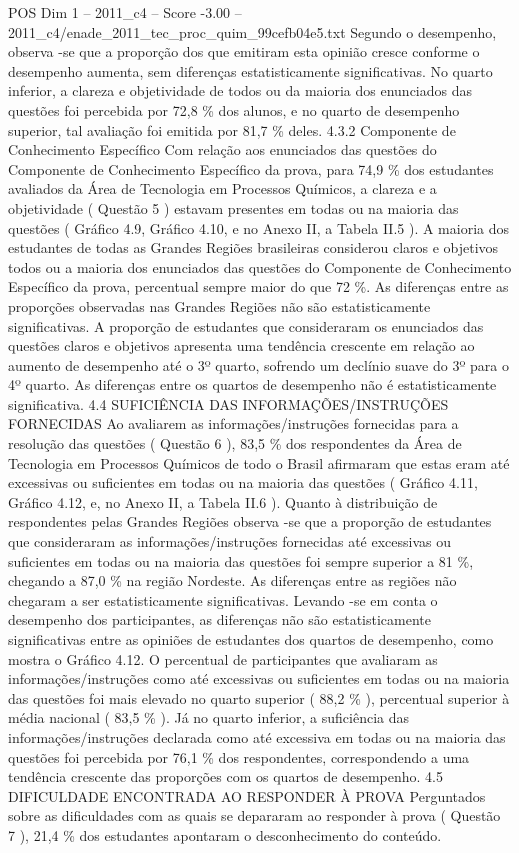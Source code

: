 \begin{textsample}{POS Dim 1 – 2011\_c4 – Score -3.00 – 2011\_c4/enade\_2011\_tec\_proc\_quim\_99cefb04e5.txt}
Segundo o desempenho, observa -se que a proporção dos que emitiram esta opinião cresce conforme o desempenho aumenta, sem diferenças estatisticamente significativas.
No quarto inferior, a clareza e objetividade de todos ou da maioria dos enunciados das questões foi percebida por 72,8 \% dos alunos, e no quarto de desempenho superior, tal avaliação foi emitida por 81,7 \% deles. 4.3.2 Componente de Conhecimento Específico Com relação aos enunciados das questões do Componente de Conhecimento Específico da prova, para 74,9 \% dos estudantes avaliados da Área de Tecnologia em Processos Químicos, a clareza e a objetividade ( Questão 5 ) estavam presentes em todas ou na maioria das questões ( Gráfico 4.9, Gráfico 4.10, e no Anexo II, a Tabela II.5 ).
A maioria dos estudantes de todas as Grandes Regiões brasileiras considerou claros e objetivos todos ou a maioria dos enunciados das questões do Componente de Conhecimento Específico da prova, percentual sempre maior do que 72 \%.
As diferenças entre as proporções observadas nas Grandes Regiões não são estatisticamente significativas.
A proporção de estudantes que consideraram os enunciados das questões claros e objetivos apresenta uma tendência crescente em relação ao aumento de desempenho até o 3º quarto, sofrendo um declínio suave do 3º para o 4º quarto.
As diferenças entre os quartos de desempenho não é estatisticamente significativa. 4.4 SUFICIÊNCIA DAS INFORMAÇÕES/INSTRUÇÕES FORNECIDAS Ao avaliarem as informações/instruções fornecidas para a resolução das questões ( Questão 6 ), 83,5 \% dos respondentes da Área de Tecnologia em Processos Químicos de todo o Brasil afirmaram que estas eram até excessivas ou suficientes em todas ou na maioria das questões ( Gráfico 4.11, Gráfico 4.12, e, no Anexo II, a Tabela II.6 ).
Quanto à distribuição de respondentes pelas Grandes Regiões observa -se que a proporção de estudantes que consideraram as informações/instruções fornecidas até excessivas ou suficientes em todas ou na maioria das questões foi sempre superior a 81 \%, chegando a 87,0 \% na região Nordeste.
As diferenças entre as regiões não chegaram a ser estatisticamente significativas.
Levando -se em conta o desempenho dos participantes, as diferenças não são estatisticamente significativas entre as opiniões de estudantes dos quartos de desempenho, como mostra o Gráfico 4.12.
O percentual de participantes que avaliaram as informações/instruções como até excessivas ou suficientes em todas ou na maioria das questões foi mais elevado no quarto superior ( 88,2 \% ), percentual superior à média nacional ( 83,5 \% ).
Já no quarto inferior, a suficiência das informações/instruções declarada como até excessiva em todas ou na maioria das questões foi percebida por 76,1 \% dos respondentes, correspondendo a uma tendência crescente das proporções com os quartos de desempenho. 4.5 DIFICULDADE ENCONTRADA AO RESPONDER À PROVA Perguntados sobre as dificuldades com as quais se depararam ao responder à prova ( Questão 7 ), 21,4 \% dos estudantes apontaram o desconhecimento do conteúdo.

\end{textsample}
